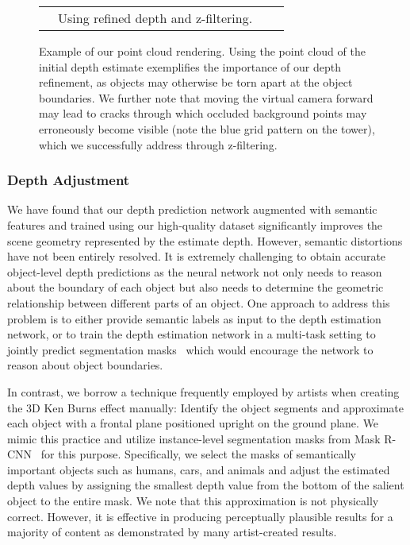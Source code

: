 \documentclass[acmtog,authorversion]{acmart}
\begin{document}
\begin{figure*}
\begin{tabular}{cccc}
        &
            \footnotesize Using refined depth and z-filtering.
        \\
    \end{tabular}\vspace{-0.2cm}
    \caption{Example of our point cloud rendering. Using the point cloud of the initial depth estimate exemplifies the importance of our depth refinement, as objects may otherwise be torn apart at the object boundaries. We further note that moving the virtual camera forward may lead to cracks through which occluded background points may erroneously become visible (note the blue grid pattern on the tower), which we successfully address through z-filtering.}\vspace{-0.2cm}
    \label{fig:rendering}
\end{figure*}

\subsubsection{Depth Adjustment}

We have found that our depth prediction network augmented with semantic features and trained using our high-quality dataset significantly improves the scene geometry represented by the estimate depth. However, semantic distortions have not been entirely resolved. It is extremely challenging to obtain accurate object-level depth predictions as the neural network not only needs to reason about the boundary of each object but also needs to determine the geometric relationship between different parts of an object. One approach to address this problem is to either provide semantic labels as input to the depth estimation network, or to train the depth estimation network in a multi-task setting to jointly predict segmentation masks~\cite{Eigen_ICCV_2015, Liu_CVPR_2010, Mousavian_OTHER_2016, Nekrasov_ARXIV_2018} which would encourage the network to reason about object boundaries.

In contrast, we borrow a technique frequently employed by artists when creating the 3D Ken Burns effect manually: Identify the object segments and approximate each object with a frontal plane positioned upright on the ground plane. We mimic this practice and utilize instance-level segmentation masks from Mask R-CNN~\cite{He_ICCV_2017} for this purpose. Specifically, we select the masks of semantically important objects such as humans, cars, and animals and adjust the estimated depth values by assigning the smallest depth value from the bottom of the salient object to the entire mask. We note that this approximation is not physically correct. However, it is effective in producing perceptually plausible results for a majority of content as demonstrated by many artist-created results.
\end{document}
